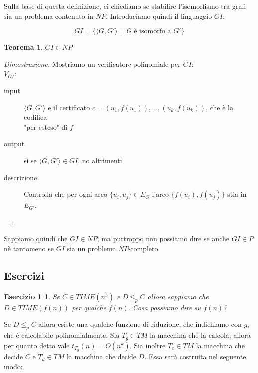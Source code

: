 Sulla base di questa definizione, ci chiediamo se stabilire l'isomorfismo tra grafi sia un problema contenuto in $NP$. Introduciamo quindi il linguaggio $GI$:

\[
	GI = \{ \langle G, G' \rangle \ \mid \ G \text{ è isomorfo a } G'\}
\]

\theoremstyle{plain}
\newtheorem*{theo1}{Teorema}
\begin{theo1} 
$GI \in NP$
\end{theo1}

\begin{proof}[Dimostrazione]
	Mostriamo un verificatore polinomiale per $GI$:
	\\

	$V_{GI}$:
	\begin{description}
		\item[input] $\langle G, G' \rangle$ e il certificato $c = (u_1, f(u_1)), ..., (u_k, f(u_k))$, che è la codifica \\
		"per esteso" di $f$

		\item[output] sì se $\langle G, G' \rangle \in GI$, no altrimenti

		\item[descrizione] Controlla che per ogni arco $\{ u_i, u_j \} \in E_G$ l'arco $\{ f(u_i), f(u_j) \}$ stia in $E_{G'}$.
	\end{description}
\end{proof}

Sappiamo quindi che $GI \in NP$, ma purtroppo non possiamo dire se anche $GI \in P$ nè tantomeno se $GI$ sia un problema $NP$-completo.

\subsection{Esercizi}

\newtheorem*{exc1}{Esercizio 1}
\begin{exc1}
	Se $C \in TIME(n^3)$ e $D \leq_p C$ allora sappiamo che $D \in TIME(f(n))$ per qualche $f(n)$. Cosa possiamo dire su $f(n)$?
\end{exc1}

Se $D \leq_p C$ allora esiste una qualche funzione di riduzione, che indichiamo con $g$, che è calcolabile polinomialmente. Sia $T_g \in TM$ la macchina che la calcola, allora per quanto detto vale $t_{T_g}(n) = O(n^k)$. Sia inoltre $T_c \in TM$ la macchina che decide $C$ e $T_d \in TM$ la macchina che decide $D$. Essa sarà costruita nel seguente modo:

